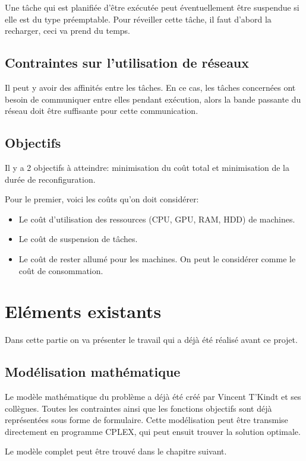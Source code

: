 Une tâche qui est planifiée d'être exécutée peut éventuellement être suspendue si elle est du type préemptable. Pour réveiller cette tâche, il faut d'abord la recharger, ceci va prend du temps.

\subsection{Contraintes sur l'utilisation de réseaux}
Il peut y avoir des affinités entre les tâches. En ce cas, les tâches concernées ont besoin de communiquer entre elles pendant exécution, alors la bande passante du réseau doit être suffisante pour cette communication.



\subsection{Objectifs}
Il y a 2 objectifs à atteindre: minimisation du coût total et minimisation de la durée de reconfiguration.

Pour le premier, voici les coûts qu'on doit considérer:
\bigskip
\begin{itemize}
	\item Le coût d'utilisation des ressources (CPU, GPU, RAM, HDD) de machines.
	\item Le coût de suspension de tâches.
	\item Le coût de rester allumé pour les machines. On peut le considérer comme le coût de consommation. \end{itemize}
\bigskip




\section{Eléments existants}
Dans cette partie on va présenter le travail qui a déjà été réalisé avant ce projet.

\subsection{Modélisation mathématique}
Le modèle mathématique du problème a déjà été créé par Vincent T'Kindt et ses collègues. Toutes les contraintes ainsi que les fonctions objectifs sont déjà représentées sous forme de formulaire. Cette modélisation peut être transmise directement en programme CPLEX, qui peut ensuit trouver la solution optimale.


Le modèle complet peut être trouvé dans le chapitre suivant.

